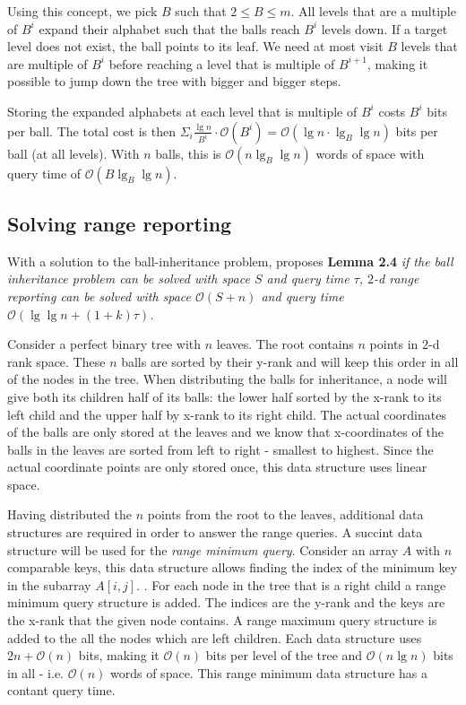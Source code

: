 Using this concept, we pick $B$ such that $2 \leq B \leq m$. All levels that are a multiple of $B^i$ expand their alphabet such that the balls reach $B^i$ levels down. If a target level does not exist, the ball points to its leaf. We need at most visit $B$ levels that are multiple of $B^i$ before reaching a level that is multiple of $B^{i+1}$, making it possible to jump down the tree with bigger and bigger steps.

Storing the expanded alphabets at each level that is multiple of $B^i$ costs $B^i$ bits per ball. The total cost is then $\Sigma_i \frac{\lg n}{B^i} \cdot \mathcal{O}(B^i) = \mathcal{O}(\lg n \cdot \lg_B \lg n)$ bits per ball (at all levels). With $n$ balls, this is $\mathcal{O}(n \lg_B \lg n)$ words of space with query time of $\mathcal{O}(B \lg_B \lg n)$. 


\subsection{Solving range reporting}
With a solution to the ball-inheritance problem, \citet{chanetal} proposes \textbf{Lemma 2.4} \emph{if the ball inheritance problem can be solved with space $S$ and query time $\tau$, $2$-d range reporting can be solved with space $\mathcal{O}(S+n)$ and query time $\mathcal{O}(\lg \lg n + (1+k) \tau)$.}

Consider a perfect binary tree with $n$ leaves. The root contains $n$ points in $2$-d rank space. These $n$ balls are sorted by their y-rank and will keep this order in all of the nodes in the tree. When distributing the balls for inheritance, a node will give both its children half of its balls: the lower half sorted by the x-rank to its left child and the upper half by x-rank to its right child. The actual coordinates of the balls are only stored at the leaves and we know that x-coordinates of the balls in the leaves are sorted from left to right - smallest to highest. Since the actual coordinate points are only stored once, this data structure uses linear space.

Having distributed the $n$ points from the root to the leaves, additional data structures are required in order to answer the range queries. A succint data structure will be used for the \emph{range minimum query}. Consider an array $A$ with $n$ comparable keys, this data structure allows finding the index of the minimum key in the subarray $A[i,j]$. . For each node in the tree that is a right child a range minimum query structure is added. The indices are the y-rank and the keys are the x-rank that the given node contains. A range maximum query structure is added to the all the nodes which are left children. Each data structure uses $2n + \mathcal{O}(n)$ bits, making it $\mathcal{O}(n)$ bits per level of the tree and $\mathcal{O}(n \lg n)$ bits in all - i.e. $\mathcal{O}(n)$ words of space. This range minimum data structure has a contant query time. \\

